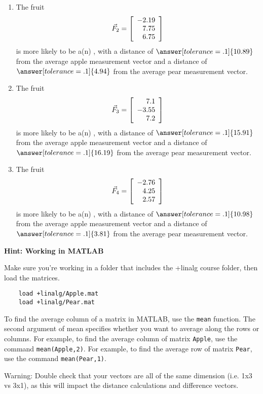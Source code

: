 \documentclass{ximera}
\begin{document}
\begin{problem}
\begin{enumerate}
\item
The fruit
\begin{equation*}
  \vec{F}_2=\startmat{r}
    -2.19 \\
    7.75 \\
    6.75
  \stopmat
\end{equation*}
is more likely to be a(n) , with a distance of $\answer[tolerance=.1]{10.89}$ from the average apple measurement vector and a distance of $\answer[tolerance=.1]{4.94}$ from the average pear measurement vector.

\item
The fruit
\begin{equation*}
  \vec{F}_3=\startmat{r}
    7.1 \\
    -3.55 \\
    7.2
  \stopmat
\end{equation*}
is more likely to be a(n) , with a distance of $\answer[tolerance=.1]{15.91}$ from the average apple measurement vector and a distance of $\answer[tolerance=.1]{16.19}$ from the average pear measurement vector.

\item
The fruit
\begin{equation*}
  \vec{F}_4=\startmat{r}
    -2.76 \\
    4.25 \\
    2.57
  \stopmat
\end{equation*}
is more likely to be a(n) , with a distance of $\answer[tolerance=.1]{10.98}$ from the average apple measurement vector and a distance of $\answer[tolerance=.1]{3.81}$ from the average pear measurement vector.

\end{enumerate}

{\bf Hint: Working in MATLAB}

  Make sure you're working in a folder that includes the +linalg course folder, then load the matrices.

  \begin{verbatim}
    load +linalg/Apple.mat
    load +linalg/Pear.mat
  \end{verbatim}

  To find the average column of a matrix in MATLAB, use the \texttt{mean} function. The second argument of mean specifies whether you want to average along the rows or columns. For example, to find the average column of matrix \texttt{Apple}, use the command \texttt{mean(Apple,2)}. For example, to find the average row of matrix \texttt{Pear}, use the command \texttt{mean(Pear,1)}.

  Warning: Double check that your vectors are all of the same dimension (i.e. 1x3 vs 3x1), as this will impact the distance calculations and difference vectors.



  
\end{problem}
\end{document}
